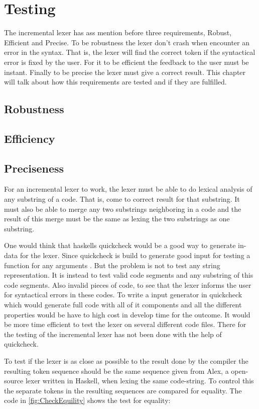 \chapter{Testing}
The incremental lexer has ass mention before three requirements, Robust, Efficient and Precise. To be robustness the lexer don't crash when encounter an error in the syntax. That is, the lexer will find the correct token if the syntactical error is fixed by the user. For it to be efficient the feedback to the user must be instant.
Finally to be precise the lexer must give a correct result. This chapter will talk about how this requirements are tested and if they are fulfilled. 

\section{Robustness}

\section{Efficiency}

\section{Preciseness}
For an incremental lexer to work, the lexer must be able to do lexical analysis of any substring of a code. That is, come to correct result for that substring. It must also be able to merge any two substrings neighboring in a code and the result of this merge must be the same as lexing the two substrings as one substring.

One would think that haskells quickcheck would be a good way to generate in-data for the lexer. Since quickcheck is build to generate good input for testing a function for any arguments \cite{QuickCheck}. But the problem is not to test any string representation. It is instead to test valid code segments and any substring of this code segments. Also invalid pieces of code, to see that the lexer informs the user for syntactical errors in these codes. To write a input generator in quickcheck which would generate full code with all of it components and all the different properties would be have to high cost in develop time for the outcome. It would be more time efficient to test the lexer on several different code files. There for the testing of the incremental lexer has not been done with the help of quickcheck.

To test if the lexer is as close as possible to the result done by the compiler the resulting token sequence should be the same sequence given from Alex, a open-source lexer written in Haskell, when lexing the same code-string.
To control this the separate tokens in the resulting sequences are compared for equality. 
The code in \cref{fig:CheckEquility} shows the test for equality:

